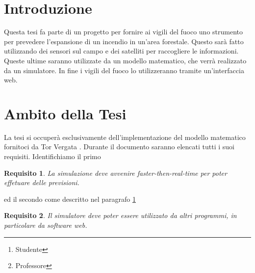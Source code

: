 \documentclass[draft]{article}
\title{\mytitle}
\date{2021}
\author{Diego Bellani\thanks{Studente}\and Enrico Tronci\thanks{Professore}}
\newcommand{\eng}[1]{\foreignlanguage{english}{#1}} %
\let\oldmarginpar\marginpar
\renewcommand{\marginpar}[1]{\oldmarginpar{\raggedright #1}}
\newtheorem{requirement}{Requisito}
\begin{document}
\begin{titlepage}
	\maketitle

	\begin{abstract}
	Questo documento \marginpar{Da espandere.} contiene le specifiche dei
	requisiti per la tesi sulla simulazione \eng{multi-core} di incendi.
	\end{abstract}

	\tableofcontents
	\listoffigures
	\listoftables
\end{titlepage}


\section{Introduzione}\label{sec:intro}

Questa tesi fa parte di un progetto per fornire ai vigili del fuoco uno
strumento per prevedere l'espansione di un incendio in un'area forestale. Questo
sarà fatto utilizzando dei sensori sul campo e dei satelliti per raccogliere le
informazioni. Queste ultime saranno utilizzate da un modello matematico, che
verrà realizzato da un simulatore. In fine i vigili del fuoco lo utilizzeranno
tramite un'interfaccia \eng{web}.

\section{Ambito della Tesi}

La tesi si occuperà esclusivamente dell'implementazione del modello matematico
fornitoci da Tor Vergata \cite{mod}. Durante il documento saranno elencati tutti
i suoi requisiti. Identifichiamo il primo


\begin{requirement}\label{thm:faster}
La simulazione deve avvenire \eng{faster-then-real-time} per poter effetuare
delle previsioni.
\end{requirement}

ed il secondo come descritto nel paragrafo \ref{sec:intro}

\begin{requirement}\label{thm:used}
Il simulatore deve poter essere utilizzato da altri programmi, in particolare da
\eng{software web}.
\end{requirement}
\end{document}

